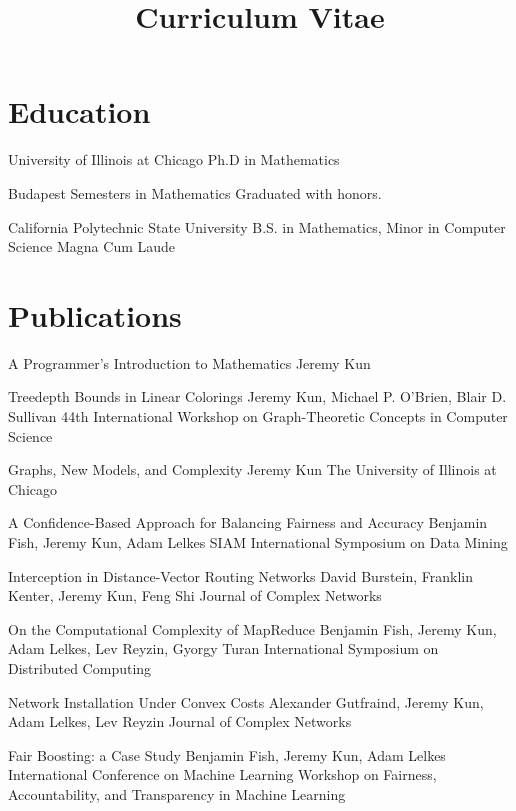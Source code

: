 \documentclass[11pt]{moderncv}
\title{Curriculum Vitae}
\begin{document}
\maketitle


\section{Education}

  {University of Illinois at Chicago}
  {}
  {Ph.D in Mathematics}
  {}
  {}


  {Budapest Semesters in Mathematics}
  {}
  {}
  {}
  {Graduated with honors.}


  {California Polytechnic State University}
  {}
  {B.S. in Mathematics, Minor in Computer Science}
  {}
  {Magna Cum Laude}


\section{Publications}

  {A Programmer's Introduction to Mathematics}
  {Jeremy Kun}
  {}
  {}
  {}

  {Treedepth Bounds in Linear Colorings}
  {Jeremy Kun, Michael P. O'Brien, Blair D. Sullivan}
  {44th International Workshop on Graph-Theoretic Concepts in Computer Science}
  {}
  {}

  {Graphs, New Models, and Complexity}
  {Jeremy Kun}
  {The University of Illinois at Chicago}
  {}
  {}

  {A Confidence-Based Approach for Balancing Fairness and Accuracy}
  {Benjamin Fish, Jeremy Kun, Adam Lelkes}
  {SIAM International Symposium on Data Mining}
  {}
  {}

  {Interception in Distance-Vector Routing Networks}
  {David Burstein, Franklin Kenter, Jeremy Kun, Feng Shi}
  {Journal of Complex Networks}
  {}
  {}

  {On the Computational Complexity of MapReduce}
  {Benjamin Fish, Jeremy Kun, Adam Lelkes, Lev Reyzin, Gyorgy Turan}
  {International Symposium on Distributed Computing}
  {}
  {}

  {Network Installation Under Convex Costs}
  {Alexander Gutfraind, Jeremy Kun, Adam Lelkes, Lev Reyzin}
  {Journal of Complex Networks}
  {}
  {}

  {Fair Boosting: a Case Study}
  {Benjamin Fish, Jeremy Kun, Adam Lelkes}
  {International Conference on Machine Learning Workshop on Fairness, Accountability, and Transparency in Machine Learning}
  {}
  {}
\end{document}
